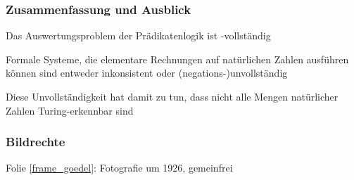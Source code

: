 \documentclass[onlymath]{beamer}
\begin{document}
\begin{frame}\frametitle{Zusammenfassung und Ausblick}

Das Auswertungsproblem der Prädikatenlogik ist \PSpace-vollständig\bigskip

Formale Systeme, die elementare Rechnungen auf natürlichen Zahlen ausführen können
sind entweder inkonsistent oder (negations-)unvollständig
\bigskip

Diese Unvollständigkeit hat damit zu tun, dass nicht alle Mengen natürlicher Zahlen Turing-erkennbar sind\bigskip


\end{frame}


\begin{frame}[t]\frametitle{Bildrechte}

Folie \ref{frame_goedel}: Fotografie um 1926, gemeinfrei

\end{frame}
\end{document}
